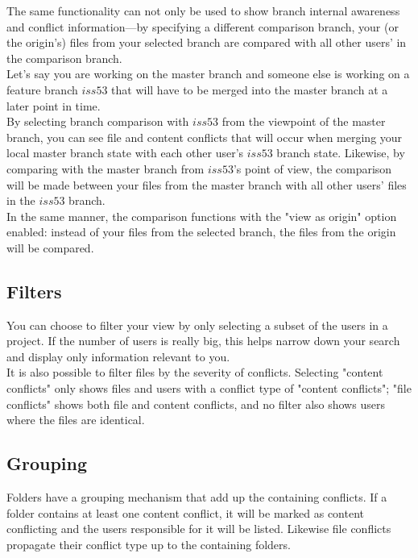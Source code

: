 The same functionality can not only be used to show branch internal awareness and conflict information---by specifying a different comparison branch, your (or the origin's) files from your selected branch are compared with all other users' in the comparison branch. \\

Let's say you are working on the master branch and someone else is working on a feature branch $iss53$ that will have to be merged into the master branch at a later point in time. \\

By selecting branch comparison with $iss53$ from the viewpoint of the master branch, you can see file and content conflicts that will occur when merging your local master branch state with each other user's $iss53$ branch state. Likewise, by comparing with the master branch from $iss53$'s point of view, the comparison will be made between your files from the master branch with all other users' files in the $iss53$ branch. \\

In the same manner, the comparison functions with the "view as origin" option enabled: instead of your files from the selected branch, the files from the origin will be compared.

\subsection{Filters}

You can choose to filter your view by only selecting a subset of the users in a project. If the number of users is really big, this helps narrow down your search and display only information relevant to you. \\

It is also possible to filter files by the severity of conflicts. Selecting "content conflicts" only shows files and users with a conflict type of "content conflicts"; "file conflicts" shows both file and content conflicts, and no filter also shows users where the files are identical.

\subsection{Grouping}

Folders have a grouping mechanism that add up the containing conflicts. If a folder contains at least one content conflict, it will be marked as content conflicting and the users responsible for it will be listed. Likewise file conflicts propagate their conflict type up to the containing folders.

